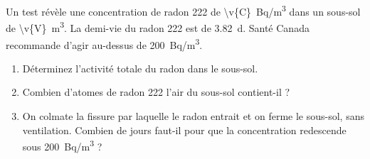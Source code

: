 Un test révèle une concentration de radon 222 de \qty{\v{C}}{Bq/m^3} dans un sous-sol de \qty{\v{V}}{m^3}. La demi-vie du radon 222 est de \qty{3.82}{d}. Santé Canada recommande d'agir au-dessus de \qty{200}{Bq/m^3}.

\begin{enumerate}[label=\alph*)]
    \item Déterminez l'activité totale du radon dans le sous-sol.
    \item Combien d'atomes de radon 222 l'air du sous-sol contient-il ?
    \item On colmate la fissure par laquelle le radon entrait et on ferme le sous-sol, sans ventilation. Combien de jours faut-il pour que la concentration redescende sous \qty{200}{Bq/m^3} ?
\end{enumerate}
